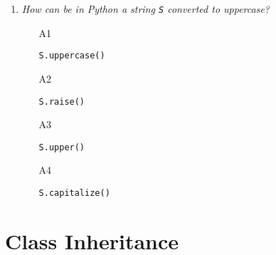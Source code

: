 \begin{enumerate}
\vspace{6mm}

\item {\em How can be in Python a string {\tt S} converted to uppercase?}\\

\begin{enumerate}
\item[A1] 
\begin{verbatim}
S.uppercase()
\end{verbatim}
\item[A2] 
\begin{verbatim}
S.raise()
\end{verbatim}
\item[A3] 
\begin{verbatim}
S.upper()
\end{verbatim}
\item[A4] 
\begin{verbatim}
S.capitalize()
\end{verbatim}
\end{enumerate}

\vspace{6mm}

\end{enumerate}


\section{Class Inheritance}

